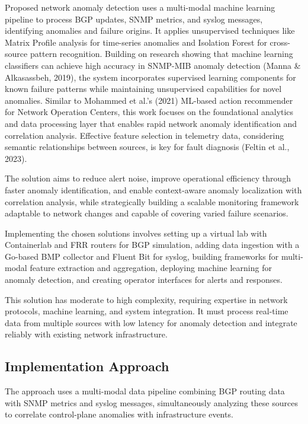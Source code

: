 \documentclass[11pt]{article}
\begin{document}
Proposed network anomaly detection uses a multi-modal machine learning pipeline to process BGP updates, SNMP metrics, and syslog messages, identifying anomalies and failure origins. It applies unsupervised techniques like Matrix Profile analysis for time-series anomalies and Isolation Forest for cross-source pattern recognition. Building on research showing that machine learning classifiers can achieve high accuracy in SNMP-MIB anomaly detection (Manna \& Alkasassbeh, 2019), the system incorporates supervised learning components for known failure patterns while maintaining unsupervised capabilities for novel anomalies. Similar to Mohammed et al.'s (2021) ML-based action recommender for Network Operation Centers, this work focuses on the foundational analytics and data processing layer that enables rapid network anomaly identification and correlation analysis. Effective feature selection in telemetry data, considering semantic relationships between sources, is key for fault diagnosis (Feltin et al., 2023).

The solution aims to reduce alert noise, improve operational efficiency through faster anomaly identification, and enable context-aware anomaly localization with correlation analysis, while strategically building a scalable monitoring framework adaptable to network changes and capable of covering varied failure scenarios.

Implementing the chosen solutions involves setting up a virtual lab with Containerlab and FRR routers for BGP simulation, adding data ingestion with a Go-based BMP collector and Fluent Bit for syslog, building frameworks for multi-modal feature extraction and aggregation, deploying machine learning for anomaly detection, and creating operator interfaces for alerts and responses.

This solution has moderate to high complexity, requiring expertise in network protocols, machine learning, and system integration. It must process real-time data from multiple sources with low latency for anomaly detection and integrate reliably with existing network infrastructure.

\subsection{Implementation Approach}

The approach uses a multi-modal data pipeline combining BGP routing data with SNMP metrics and syslog messages, simultaneously analyzing these sources to correlate control-plane anomalies with infrastructure events.
\end{document}
